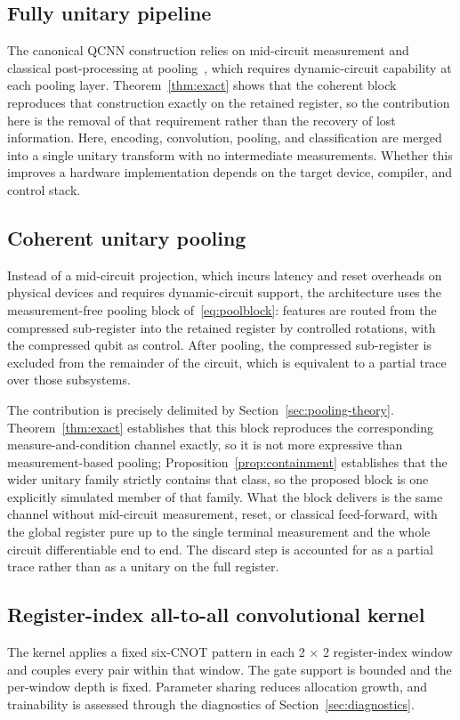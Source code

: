 \documentclass[conference]{IEEEtran}
\begin{document}
\subsection{Fully unitary pipeline}
The canonical QCNN construction relies on mid-circuit measurement and classical post-processing at pooling~\cite{ref37}, which requires dynamic-circuit capability at each pooling layer. Theorem~\ref{thm:exact} shows that the coherent block reproduces that construction exactly on the retained register, so the contribution here is the removal of that requirement rather than the recovery of lost information. Here, encoding, convolution, pooling, and classification are merged into a single unitary transform with no intermediate measurements. Whether this improves a hardware implementation depends on the target device, compiler, and control stack.

\subsection{Coherent unitary pooling}
Instead of a mid-circuit projection, which incurs latency and reset overheads on physical devices and requires dynamic-circuit support, the architecture uses the measurement-free pooling block of~\eqref{eq:poolblock}: features are routed from the compressed sub-register into the retained register by controlled rotations, with the compressed qubit as control. After pooling, the compressed sub-register is excluded from the remainder of the circuit, which is equivalent to a partial trace over those subsystems.

The contribution is precisely delimited by Section~\ref{sec:pooling-theory}. Theorem~\ref{thm:exact} establishes that this block reproduces the corresponding measure-and-condition channel exactly, so it is not more expressive than measurement-based pooling; Proposition~\ref{prop:containment} establishes that the wider unitary family strictly contains that class, so the proposed block is one explicitly simulated member of that family. What the block delivers is the same channel without mid-circuit measurement, reset, or classical feed-forward, with the global register pure up to the single terminal measurement and the whole circuit differentiable end to end. The discard step is accounted for as a partial trace rather than as a unitary on the full register.

\subsection{Register-index all-to-all convolutional kernel}
The kernel applies a fixed six-CNOT pattern in each 2 $\times$ 2 register-index window and couples every pair within that window. The gate support is bounded and the per-window depth is fixed. Parameter sharing reduces allocation growth, and trainability is assessed through the diagnostics of Section~\ref{sec:diagnostics}.
\end{document}
